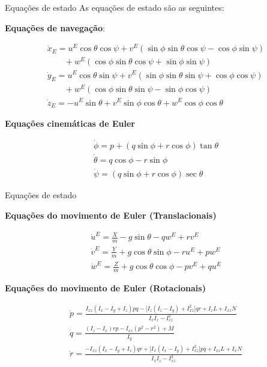 \documentclass{beamer}
\begin{document}

\begin{frame}{Equações de estado}
    As equações de estado são as seguintes:

    \justifying \textbf{Equações de navegação}:

    \begin{gather*}
        \dot{x}_E = u^E \cos\theta \cos\psi 
                   + v^E (\sin\phi \sin\theta \cos\psi - \cos\phi \sin\psi) \\
                   \qquad + w^E (\cos\phi \sin\theta \cos\psi + \sin\phi \sin\psi) \\[6pt]
        \dot{y}_E = u^E \cos\theta \sin\psi 
                   + v^E (\sin\phi \sin\theta \sin\psi + \cos\phi \cos\psi) \\
                   \qquad + w^E (\cos\phi \sin\theta \sin\psi - \sin\phi \cos\psi) \\[6pt]
        \dot{z}_E = -u^E \sin\theta + v^E \sin\phi \cos\theta + w^E \cos\phi \cos\theta
    \end{gather*}

    \justifying \textbf{Equações cinemáticas de Euler}

    \begin{gather*}
    \dot{\phi} = p + (q \sin\phi + r \cos\phi) \tan\theta \\
    \dot{\theta} = q \cos\phi - r \sin\phi \\
    \dot{\psi} = (q \sin\phi + r \cos\phi) \sec\theta
    \end{gather*}

\end{frame}


\begin{frame}{Equações de estado}

    \justifying \textbf{Equações do movimento de Euler (Translacionais)}

    \begin{gather*}
        \dot{u}^E = \frac{X}{m} - g \sin\theta - q w^E + r v^E \\
        \dot{v}^E = \frac{Y}{m} + g \cos\theta \sin\phi - r u^E + p w^E \\
        \dot{w}^E = \frac{Z}{m} + g \cos\theta \cos\phi - p v^E + q u^E
    \end{gather*}

    \justifying \textbf{Equações do movimento de Euler (Rotacionais)}
    
    \begin{gather*}
    \dot{p} = \frac{I_{xz}(I_x - I_y + I_z)pq - \big[I_z(I_z - I_y) + I_{xz}^2\big]qr + I_z L + I_{xz} N}{I_x I_z - I_{xz}^2} \\
    \dot{q} = \frac{(I_z - I_x)rp - I_{xz}(p^2 - r^2) + M}{I_y} \\
    \dot{r} = \frac{-I_{xz}(I_x - I_y + I_z)qr + \big[I_x(I_x - I_y) + I_{xz}^2\big]pq + I_{xz} L + I_x N}{I_x I_z - I_{xz}^2}
    \end{gather*}
\end{frame}
\end{document}
